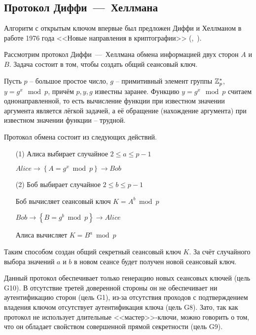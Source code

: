 \subsection{Протокол Диффи~---~Хеллмана}\label{section-protocols-diffie-hellman}

Алгоритм с открытым ключом впервые был предложен Диффи и Хеллманом в работе 1976 года <<Новые направления в криптографии>> (,~\cite{Diffie:Hellman:1976}).

Рассмотрим протокол Диффи~---~Хеллмана обмена информацией двух сторон $A$ и $B$. Задача состоит в том, чтобы создать общий сеансовый ключ.

Пусть $p$ -- большое простое число, $g$ -- примитивный элемент группы $\mathbb{Z}_p^*$, ~ $y = g^x \mod p$, причём $p,y,g$ известны заранее. Функцию $y=g^{x} \mod p$ считаем однонаправленной, то есть вычисление функции при известном значении аргумента является лёгкой задачей, а её обращение (нахождение аргумента) при известном значении функции -- трудной.

Протокол обмена состоит из следующих действий.
\begin{enumerate}
    \item[(1)] Алиса выбирает случайное $2 \leq a \leq p - 1$
    \item[{}] $Alice \to \left\{ A = g ^ x \bmod p \right\} \to Bob$
    \item[(2)] Боб выбирает случайное $2 \leq b \leq p-1$
    \item[{}] Боб вычисляет сеансовый ключ $K = A ^ b \bmod p$
    \item[{}] $Bob \to \left\{ B = g ^ b \bmod p \right\} \to Alice$
    \item[{}] Алиса вычисляет $K = B ^ a \bmod p$
\end{enumerate}

Таким способом создан общий секретный сеансовый ключ $K$. За счёт случайного выбора значений $a$ и $b$ в новом сеансе будет получен новой сеансовый ключ.

Данный протокол обеспечивает только генерацию новых сеансовых ключей (цель G10). В отсутствие третей доверенной стороны он не обеспечивает ни аутентификацию сторон (цель G1), из-за отсутствия проходов с подтверждением владения ключом отсутствует аутентификация ключа (цель G8). Зато, так как протокол не использует длительные <<мастер>>-ключи, можно говорить о том, что он обладает свойством совершенной прямой секретности (цель G9).

